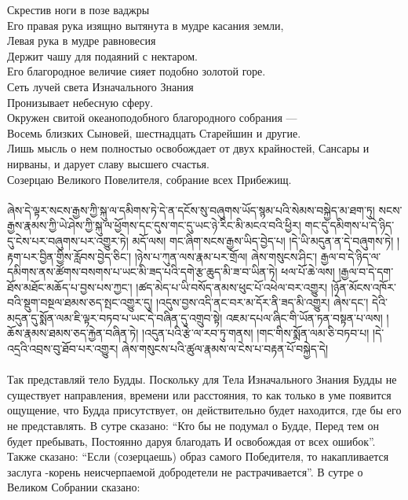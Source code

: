 Скрестив ноги в позе ваджры\\
Его правая рука изящно вытянута в мудре касания земли,\\
Левая рука в мудре равновесия\\
Держит чашу для подаяний с нектаром.\\
Его благородное величие сияет подобно золотой горе.\\
Сеть лучей света Изначального Знания\\
Пронизывает небесную сферу.\\
Окружен свитой океаноподобного благородного собрания —\\
Восемь близких Сыновей, шестнадцать Старейшин и другие.\\
Лишь мысль о нем полностыо освобождает от двух крайностей,
Сансары и нирваны, и дарует славу высшего счастья.\\
Созерцаю Великого Повелителя, собрание всех Прибежищ.\\
\\
\scriptsize
\ti
ཞེས་དེ་ལྟར་སངས་རྒྱས་ཀྱི་སྐུ་ལ་དམིགས་ཏེ་དེ་ན་དངོས་སུ་བཞུགས་ཡོད་སྙམ་པའི་སེམས་བསྐྱེད་མ་ཐག་ཏུ། 
སངས་རྒྱས་རྣམས་ཀྱི་ཡེ་ཤེས་ཀྱི་སྐུ་ལ་ཕྱོགས་དང་དུས་གང་དུ་ཡང་ཉེ་རིང་མི་མངའ་བའི་ཕྱིར། 
གང་དུ་དམིགས་པ་དེ་ཉིད་དུ་ངེས་པར་བཞུགས་པར་འགྱུར་ཏེ། མདོ་ལས། གང་ཞིག་སངས་རྒྱས་ཡིད་བྱེད་པ། 
།དེ་ཡི་མདུན་ན་དེ་བཞུགས་ཏེ། །རྟག་པར་བྱིན་གྱིས་རློབས་བྱེད་ཅིང་། 
།ཉེས་པ་ཀུན་ལས་རྣམ་པར་གྲོལ། ཞེས་གསུངས་ཤིང་། 
རྒྱལ་བ་དེ་ཉིད་ལ་དམིགས་ནས་ཚོགས་བསགས་པ་ཡང་མི་ཟད་པའི་དགེ་རྩ་ཆུད་མི་ཟ་བ་ཡིན་ཏེ། 
ཕལ་པོ་ཆེ་ལས། །རྒྱལ་བ་དེ་དག་ཐོས་མཐོང་མཆོད་པ་བྱས་པས་ཀྱང་།
།ཚད་མེད་པ་ཡི་བསོད་ནམས་ཕུང་པོ་འཕེལ་བར་འགྱུར། 
།ཉོན་མོངས་འཁོར་བའི་སྡུག་བསྔལ་ཐམས་ཅད་སྤང་འགྱུར་དུ། 
།འདུས་བྱས་འདི་ནང་བར་མ་དོར་ནི་ཟད་མི་འགྱུར། ཞེས་དང་། 
དེའི་མདུན་དུ་སྨོན་ལམ་ཇི་ལྟར་བཏབ་པ་ཡང་དེ་བཞིན་དུ་འགྲུབ་སྟེ། 
འཇམ་དཔལ་ཞིང་གི་ཡོན་ཏན་བསྟན་པ་ལས། །ཆོས་རྣམས་ཐམས་ཅད་རྐྱེན་བཞིན་ཏེ། 
།འདུན་པའི་རྩེ་ལ་རབ་ཏུ་གནས། །གང་གིས་སྨོན་ལམ་ཅི་བཏབ་པ། 
།དེ་འདྲའི་འབྲས་བུ་ཐོབ་པར་འགྱུར། ཞེས་གསུངས་པའི་ཚུལ་རྣམས་ལ་ངེས་པ་བརྟན་པོ་བསྐྱེད་དེ།\\
\\
\ru
Так представляй тело Будды. Поскольку для Тела Изначального Знания Будды не существует направления,
времени или расстояния, то как только в уме появится ощущение, что Будда присутствует,
он действительно будет находится, где бы его не представлять. В сутре сказано:
“Кто бы не подумал о Будде,
Перед тем он будет пребывать,
Постоянно даруя благодать
И освобождая от всех ошибок”.
Также сказано:
“Если (созерцаешь) образ самого Победителя, то накапливается заслуга -корень неисчерпаемой
добродетели не растрачивается”.
В сутре о Великом Собрании сказано:
